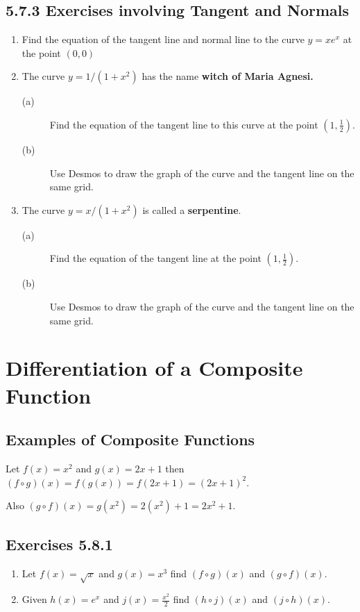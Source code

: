 \subsection{5.7.3 Exercises involving Tangent and Normals}
\begin{enumerate}
\item Find the equation of the tangent line and normal line to the curve $y =x e^{x}$ at the point $\left (0 ,0\right )$ 

\item The
curve $y =1/(1 +x^{2})$ has the name \textbf{witch of Maria Agnesi.} 


\begin{description}
\item [(a)] Find the equation of the tangent line to this curve at the point
$\left (1 ,\frac{1}{2}\right )$. 

\item [(b)]
Use Desmos to draw the graph of the curve and the tangent line on the same grid. \end{description}

\item The
curve $y =x/(1 +x^{2})$ is called a \textbf{serpentine}. 


\begin{description}
\item [(a)] Find the equation of the tangent line at the point $\left (1 ,\frac{1}{2}\right )$. 

\item [(b)]
Use Desmos to draw the graph of the curve and the tangent line on the same grid. \end{description}\end{enumerate}


\section{Differentiation of a Composite Function}


\subsection{Examples of Composite Functions}
Let $f (x) =x^{2}$ and $g (x) =2 x +1$ then $\left (f \circ g\right ) (x) =f \left (g \left (x\right )\right ) =f (2 x +1) =\left (2 x +1\right )^{2}$. 

Also $\left (g \circ f\right ) (x) =g \left (x^{2}\right ) =2 \left (x^{2}\right ) +1 =2 x^{2} +1$. 

\subsection{Exercises 5.8.1}
\begin{enumerate}
\item Let $f (x) =\sqrt{x}$ and $g (x) =x^{3}$ find $\left (f \circ g\right ) (x)$ and $\left (g \circ f\right ) \left (x\right )$. 

\item Given $h \left (x\right ) =e^{x}$ and $j (x) =\frac{x^{2}}{2}$ find $\left (h \circ j\right ) (x)$ and $\left (j \circ h\right ) (x)$. \end{enumerate}


